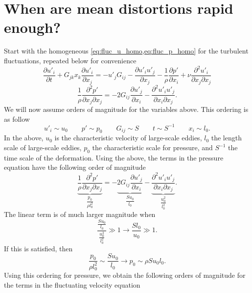\documentclass[oneside,a4paper,11pt]{report}
\newcommand{\pfluc}{p'}
\newcommand{\ufluc}{u'}
\begin{document}
\section{When are mean distortions rapid enough?}
Start with the homogeneous \cref{eq:fluc_u_homo,eq:fluc_p_homo} for the turbulent fluctuations, repeated below for convenience
\begin{equation}
\frac{\partial \ufluc_i}{\partial t} + G_{jk} x_k \frac{\partial \ufluc_i}{\partial x_j} = -\ufluc_j G_{ij} - \frac{\partial \ufluc_i \ufluc_j}{\partial x_j} - \frac{1}{\rho} \frac{\partial \pfluc}{\partial x_i} + \nu \frac{\partial^2 \ufluc_i}{\partial x_j \partial x_j} 
\end{equation}
\begin{equation}
\frac{1}{\rho} \frac{\partial^2 \pfluc}{\partial x_j \partial x_j} = -2 G_{ij} \frac{\partial \ufluc_j}{\partial x_i} - \frac{\partial^2 \ufluc_i \ufluc_j}{\partial x_i \partial x_j}.
\end{equation}
We will now assume orders of magnitude for the variables above. This ordering is as follow
\begin{equation}
    \ufluc_i \sim u_0 \qquad \pfluc \sim p_0 \qquad G_{ij} \sim S \qquad t \sim S^{-1} \qquad x_i \sim l_0.  
\end{equation}
In the above, $u_0$ is the characteristic velocity of large-scale eddies, $l_0$ the length scale of large-scale eddies, $p_0$ the characteristic scale for pressure, and $S^{-1}$ the time scale of the deformation. Using the above, the terms in the pressure equation have the following order of magnitude
\begin{equation}
\underbrace{\frac{1}{\rho} \frac{\partial^2 \pfluc}{\partial x_j \partial x_j}}_{\dfrac{p_0}{\rho l_0^2}} = -\underbrace{2 G_{ij} \frac{\partial \ufluc_j}{\partial x_i}}_{\dfrac{S u_0}{l_0}} - \underbrace{\frac{\partial^2 \ufluc_i \ufluc_j}{\partial x_i \partial x_j}}_{\dfrac{u_0^2}{l_0^2}}.
\end{equation}
The linear term is of much larger magnitude when
\begin{equation}
\frac{\frac{Su_0}{l_0}}{\frac{u_0^2}{l_0^2}} \gg 1 \to \frac{S l_0}{u_0} \gg 1.
\end{equation}
If this is satisfied, then 
\begin{equation}
\frac{p_0}{\rho l_0^2} \sim \frac{S u_0}{l_0} \to p_0 \sim \rho S u_0 l_0.
\end{equation}
Using this ordering for pressure, we obtain the following orders of magnitude for the terms in the fluctuating velocity equation
\end{document}
